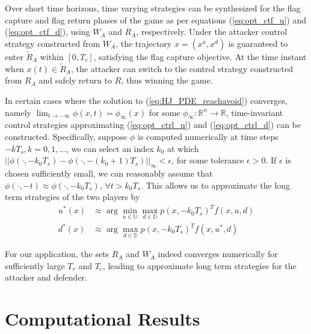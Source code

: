 \documentclass[letterpaper, 10 pt, conference]{ieeeconf}  %
\numberwithin{algorithm}{section}
\begin{document}
Over short time horizons, time varying strategies can be synthesized for the flag capture and flag return phases of the game as per equations (\ref{eq:opt_ctf_u}) and (\ref{eq:opt_ctf_d}), using $W_A$ and $R_A$, respectively.  Under the attacker control strategy constructed from $W_A$, the trajectory $x = (x^a, x^d)$ is guaranteed to enter $\tilde{R}_A$ within $[0,T_c]$, satisfying the flag capture objective.  At the time instant when $x(t) \in \tilde{R}_A$, the attacker can switch to the control strategy constructed from $R_A$ and safely return to $R$, thus winning the game.

In certain cases where the solution to (\ref{eq:HJ_PDE_reachavoid}) converges, namely $\lim_{t \rightarrow -\infty} \phi(x,t) = \phi_\infty(x)$ for some $\phi_\infty: \mathbb{R}^n \rightarrow \mathbb{R}$, time-invariant control strategies approximating (\ref{eq:opt_ctrl_u}) and (\ref{eq:opt_ctrl_d}) can be constructed.  Specifically, suppose $\phi$ is computed numerically at time steps $-kT_s, k = 0,1,...$, we can select an index $k_0$ at which $||\phi(\cdot, -k_0 T_s) - \phi(\cdot, -(k_0+1)T_s)||_\infty < \epsilon$, for some tolerance $\epsilon > 0$.  If $\epsilon$ is chosen sufficiently small, we can reasonably assume that $\phi(\cdot, -t) \approx \phi(\cdot, -k_0 T_s)$, $\forall t > k_0 T_s$.  This allows us to approximate the long term strategies of the two players by
\begin{align}
	\label{eq:opt_ctrl_inf_u}
  u^*(x) &\approx \arg \min_{u \in \mathbb{U}} \max_{d \in \mathbb{D}} p(x,-k_0 T_s)^T f(x,u,d) \\
  \label{eq:opt_ctrl_inf_d}
  d^*(x) &\approx \arg \max_{d \in \mathbb{D}} p(x,-k_0 T_s)^T f(x,u^*,d) 
\end{align}

For our application, the sets $R_A$ and $W_A$ indeed converges numerically for sufficiently large $T_r$ and $T_c$, leading to approximate long term strategies for the attacker and defender.



\section{Computational Results}
\label{sec:results}
\end{document}
